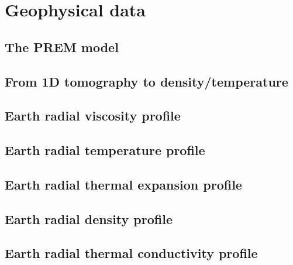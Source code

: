 \chapter{Geophysical data} 

\newpage %
\section{The PREM model} \label{ss:prem}  %
\newpage %
\section{From 1D tomography to density/temperature}  %
\newpage %
\section{Earth radial viscosity profile \label{ss:viscprof}}  %
\newpage %
\section{Earth radial temperature profile \label{ss:adiab}}  %
\newpage %
\section{Earth radial thermal expansion profile}  %
\newpage %
\section{Earth radial density profile}  %
\newpage %
\section{Earth radial thermal conductivity profile}  %
